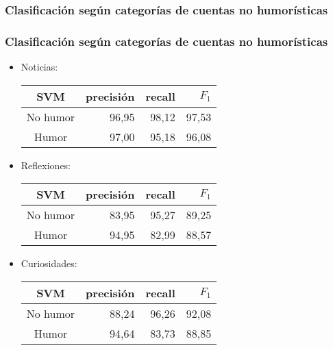 \subsubsection{Clasificación según categorías de cuentas no humorísticas}
\begin{frame}
    \frametitle{Clasificación según categorías de cuentas no humorísticas}

    \begin{itemize}[<+->]
        \item Noticias:

        \begin{center}
            \begin{tabular}{ c | r | r | r }
                \textbf{SVM} & precisión & recall & $F_1$ \\
                \hline
                No humor & 96,95 & 98,12 & 97,53 \\
                \hline
                Humor & 97,00 & 95,18 & 96,08 \\
            \end{tabular}
        \end{center}

        \item Reflexiones:
        
        \begin{center}
            \begin{tabular}{ c | r | r | r }
                \textbf{SVM} & precisión & recall & $F_1$ \\
                \hline
                No humor & 83,95 & 95,27 & 89,25 \\
                \hline
                Humor & 94,95 & 82,99 & 88,57 \\
            \end{tabular}
        \end{center}

        \item Curiosidades:

        \begin{center}
            \begin{tabular}{ c | r | r | r }
                \textbf{SVM} & precisión & recall & $F_1$ \\
                \hline
                No humor & 88,24 & 96,26 & 92,08 \\
                \hline
                Humor & 94,64 & 83,73 & 88,85 \\
            \end{tabular}
        \end{center}
    \end{itemize}
\end{frame}

